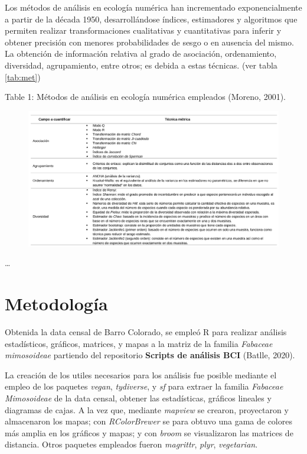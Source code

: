 \documentclass[11pt,]{article}
\begin{document}
Los métodos de análisis en ecología numérica han incrementado
exponencialmente a partir de la década 1950, desarrollándose índices,
estimadores y algoritmos que permiten realizar transformaciones
cualitativas y cuantitativas para inferir y obtener precisión con
menores probabilidades de sesgo o en ausencia del mismo. La obtención de
información relativa al grado de asociación, ordenamiento, diversidad,
agrupamiento, entre otros; es debida a estas técnicas. (ver tabla
\ref {tab:met})

Table 1: Métodos de análisis en ecología numérica empleados (Moreno,
2001).\label{tab:met}

\begin{figure}
\centering
\includegraphics[width=1.00000\textwidth]{Analisis/Diversidad/Tabla_Metodos_Analisis.png}
\caption{}
\end{figure}

\ldots

\section{Metodología}\label{metodologuxeda}

Obtenida la data censal de Barro Colorado, se empleó R para realizar
análisis estadísticos, gráficos, matrices, y mapas a la matriz de la
familia \emph{Fabaceae mimosoideae} partiendo del repositorio
\textbf{Scripts de análisis BCI} (Batlle, 2020).

La creación de los utiles necesarios para los análisis fue posible
mediante el empleo de los paquetes \emph{vegan}, \emph{tydiverse}, y
\emph{sf} para extraer la familia \emph{Fabaceae Mimosoideae} de la data
censal, obtener las estadísticas, gráficos lineales y diagramas de
cajas. A la vez que, mediante \emph{mapview} se crearon, proyectaron y
almacenaron los mapas; con \emph{RColorBrewer} se para obtuvo una gama
de colores más amplia en los gráficos y mapas; y con \emph{broom} se
visualizaron las matrices de distancia. Otros paquetes empleados fueron
\emph{magrittr}, \emph{plyr}, \emph{vegetarian}.
\end{document}
